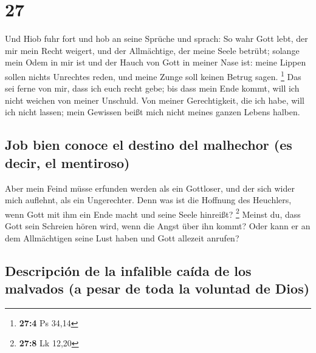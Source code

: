 \hypertarget{section-26}{%
\section{27}\label{section-26}}

 Und Hiob fuhr fort und hob an seine Sprüche und sprach:
 So wahr Gott lebt, der mir mein Recht weigert, und der
Allmächtige, der meine Seele betrübt;  solange mein Odem
in mir ist und der Hauch von Gott in meiner Nase ist: 
meine Lippen sollen nichts Unrechtes reden, und meine Zunge soll keinen
Betrug sagen. \footnote{\textbf{27:4} Ps 34,14}  Das sei
ferne von mir, dass ich euch recht gebe; bis dass mein Ende kommt, will
ich nicht weichen von meiner Unschuld.  Von meiner
Gerechtigkeit, die ich habe, will ich nicht lassen; mein Gewissen beißt
mich nicht meines ganzen Lebens halben.

\hypertarget{job-bien-conoce-el-destino-del-malhechor-es-decir-el-mentiroso}{%
\subsection{Job bien conoce el destino del malhechor (es decir, el
mentiroso)}\label{job-bien-conoce-el-destino-del-malhechor-es-decir-el-mentiroso}}

 Aber mein Feind müsse erfunden werden als ein Gottloser,
und der sich wider mich auflehnt, als ein Ungerechter. 
Denn was ist die Hoffnung des Heuchlers, wenn Gott mit ihm ein Ende
macht und seine Seele hinreißt? \footnote{\textbf{27:8} Lk 12,20}
 Meinst du, dass Gott sein Schreien hören wird, wenn die
Angst über ihn kommt?  Oder kann er an dem Allmächtigen
seine Lust haben und Gott allezeit anrufen?

\hypertarget{descripciuxf3n-de-la-infalible-cauxedda-de-los-malvados-a-pesar-de-toda-la-voluntad-de-dios}{%
\subsection{Descripción de la infalible caída de los malvados (a pesar
de toda la voluntad de
Dios)}\label{descripciuxf3n-de-la-infalible-cauxedda-de-los-malvados-a-pesar-de-toda-la-voluntad-de-dios}}

